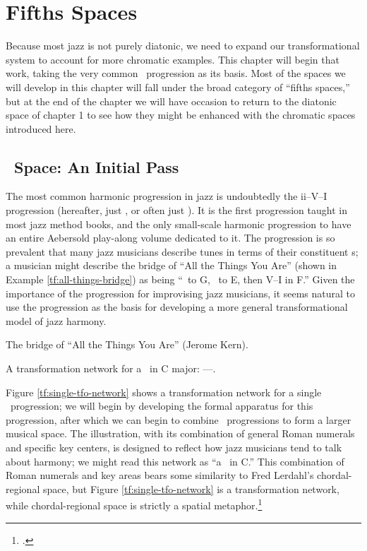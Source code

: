 \documentclass[diss]{subfiles}
\begin{document}
\chapter{Fifths Spaces}

Because most jazz is not purely diatonic, we need to expand our
transformational system to account for more chromatic examples. This chapter
will begin that work, taking the very common \tfo\ progression as its basis.
Most of the spaces we will develop in this chapter will fall under the broad
category of “fifths spaces,” but at the end of the chapter we will have
occasion to return to the diatonic space of chapter 1 to see how they might be
enhanced with the chromatic spaces introduced here.

\section{\tf\ Space: An Initial Pass}


The most common harmonic progression in jazz is undoubtedly the
\mbox{ii--V--I} progression (hereafter, just \tfo, or
often just \tf). It is the first progression taught in most jazz method books,
and the only small-scale harmonic progression to have an entire Aebersold
play-along volume dedicated to it. The progression is so prevalent
that many jazz musicians describe tunes in terms of their constituent \tf{}s;
a musician might describe the bridge of “All the Things You Are” (shown in
Example \ref{tf:all-things-bridge}) as being “\tf\ to G, \tf\ to E, then V--I
in F.” Given the importance of the progression for improvising jazz
musicians, it seems natural to use the progression as the basis for developing
a more general transformational model of jazz harmony.

\exBeg[htbp]
  \caption{The bridge of “All the Things You Are” (Jerome Kern).}
  \label{tf:all-things-bridge}
\exEnd

\figBeg[htbp]
  \caption[A transformation network for a single \tfo\ progression.]{A
  transformation network for a \tfo\ in C major: ----.}
  \label{tf:single-tfo-network}
\figEnd

Figure \ref{tf:single-tfo-network} shows a transformation network for a single
\tfo\ progression; we will begin by developing the formal apparatus for this
progression, after which we can begin to combine \tfo\ progressions to form a
larger musical space. The illustration, with its combination of general Roman
numerals and specific key centers, is designed to reflect how jazz musicians
tend to talk about harmony; we might read this network as “a \tfo\ in C.” This
combination of Roman numerals and key areas bears some similarity to Fred
Lerdahl’s chordal-regional space, but Figure \ref{tf:single-tfo-network} is a
transformation network, while chordal-regional space is strictly a spatial
metaphor.\footcite[96--97]{lerdahl:2004}
\end{document}

